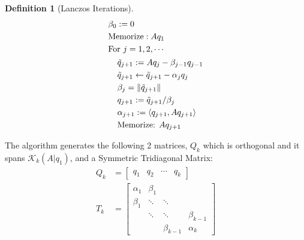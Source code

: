 \documentclass[]{article}
\theoremstyle{definition}
\newtheorem{definition}{Definition}
\begin{document}
\begin{definition}[Lanczos Iterations]
\begin{align}
\begin{aligned}
                        & \beta_0 := 0
                        \\
                        & \text{Memorize}: Aq_1
                        \\
                        & \text{For }j = 1, 2, \cdots
                        \\
                        &\hspace{1.1em}
                        \begin{aligned}
                            & \tilde{q}_{j + 1} := Aq_j - \beta_{j - 1} q_{j - 1}
                            \\
                            & \tilde{q}_{j + 1} \leftarrow \tilde{q}_{j + 1} - \alpha_jq_j
                            \\
                            & \beta_j = \Vert \tilde{q}_{j + 1}\Vert
                            \\
                            & q_{j + 1}:= \tilde{q}_{j + 1}/\beta_j
                            \\
                            & \alpha_{j + 1} := \left\langle q_{j + 1}, Aq_{j + 1} \right\rangle
                            \\
                            & \text{Memorize: }Aq_{j + 1}
                        \end{aligned}
                    \end{aligned}
                \end{align}
            \end{definition}
            The algorithm generates the following 2 matrices, $Q_k$ which is orthogonal and it spans $\mathcal K_k(A|q_1)$, and a Symmetric Tridiagonal Matrix: 
            \begin{align}
                Q_k &= \begin{bmatrix}
                    q_1 & q_2 & \cdots & q_k
                \end{bmatrix}
                \\
                T_k &= 
                \begin{bmatrix}
                    \alpha_1 & \beta_1 & & 
                    \\[0.8em]
                    \beta_1 & \ddots & \ddots & 
                    \\[0.8em]
                    &\ddots &\ddots & \beta_{k - 1}
                    \\[0.8em]
                    & & \beta_{k - 1} & \alpha_k
                \end{bmatrix}
            \end{align}
\end{document}
